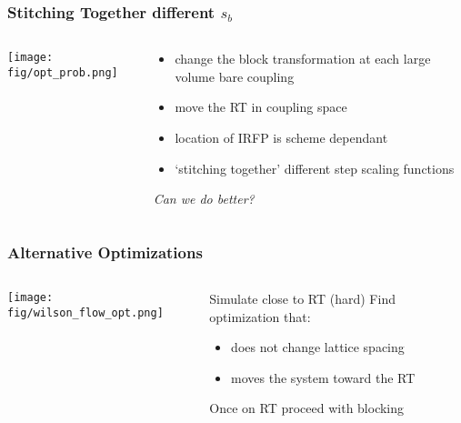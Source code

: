 \begin{frame}
  \frametitle{Stitching Together different $s_b$}
  \begin{columns}[T]
    \begin{column}{.5\textwidth}
      \begin{block}{}
        \texttt{[image: fig/opt\_prob.png]}
      \end{block}
    \end{column}
    \begin{column}{.5\textwidth}
      \begin{block}{}
        \begin{itemize}
          \item change the block transformation at each large volume bare coupling
          \item move the RT in coupling space
          \item location of IRFP is scheme dependant
          \item `stitching together' different step scaling functions
        \end{itemize}
      \end{block}
      \begin{center}\emph{Can we do better?}\end{center}
    \end{column}
  \end{columns}
\end{frame}

\begin{frame}
  \frametitle{Alternative Optimizations}
  \begin{columns}[T]
    \begin{column}{.4\textwidth}
      \begin{block}{}
        \texttt{[image: fig/wilson\_flow\_opt.png]}
      \end{block}
    \end{column}
    \begin{column}{.6\textwidth}
      \begin{block}{}
        Simulate close to RT (hard)\newline
        Find optimization that:
        \begin{itemize}
          \item does not change lattice spacing
          \item moves the system toward the RT
        \end{itemize}
        Once on RT proceed with blocking
      \end{block}
    \end{column}
  \end{columns}
\end{frame}
